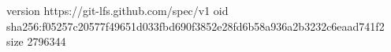 version https://git-lfs.github.com/spec/v1
oid sha256:f05257c20577f49651d033fbd690f3852e28fd6b58a936a2b3232c6eaad741f2
size 2796344
